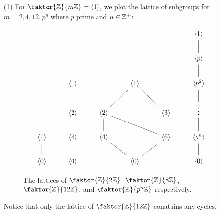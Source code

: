 \begin{example}\label{example_2.10}
  \begin{enumerate}
    \item[(1)] For $\faktor{\Z}{m\Z}=\langle 1 \rangle$, we plot the lattice of
      subgroups for $m=2,4,12, p^n$ where $p$ prime and $n \in \mathbb{Z}^+$:
      \begin{figure}[h]
        \[\begin{tikzcd}
  &&&&& {\langle 1 \rangle} \\
  &&&&& {\langle p \rangle} \\
  & {\langle 1 \rangle} && {\langle 1 \rangle} && {\langle p^2 \rangle} \\
  & {\langle 2 \rangle} & {\langle 2 \rangle} && {\langle 3 \rangle} & \vdots \\
          {\langle 1 \rangle} & {\langle 4 \rangle} & {\langle 4 \rangle} && {\langle 6 \rangle} & {\langle p^n \rangle} \\
          {\langle 0 \rangle} & {\langle 0 \rangle} && {\langle 0 \rangle} && {\langle 0 \rangle}
          \arrow[no head, from=5-1, to=6-1]
          \arrow[no head, from=5-2, to=4-2]
          \arrow[no head, from=4-2, to=3-2]
          \arrow[no head, from=4-3, to=5-3]
          \arrow[no head, from=5-3, to=6-4]
          \arrow[no head, from=6-4, to=5-5]
          \arrow[no head, from=5-5, to=4-5]
          \arrow[no head, from=4-5, to=3-4]
          \arrow[no head, from=3-4, to=4-3]
          \arrow[no head, from=4-3, to=5-5]
          \arrow[no head, from=6-2, to=5-2]
          \arrow[no head, from=2-6, to=3-6]
          \arrow[no head, from=3-6, to=4-6]
          \arrow[no head, from=4-6, to=5-6]
          \arrow[no head, from=5-6, to=6-6]
          \arrow[no head, from=1-6, to=2-6]
        \end{tikzcd}\]
        \caption{The lattices of $\faktor{\Z}{2\Z}$, $\faktor{\Z}{8\Z}$,
        $\faktor{\Z}{12\Z}$, and  $\faktor{\Z}{p^n\Z}$ respectively.}
        \label{figure_2.1}
      \end{figure}
      Notice that only the lattice of $\faktor{\Z}{12\Z}$ conatains any
      cycles.


\end{enumerate}
\end{example}
